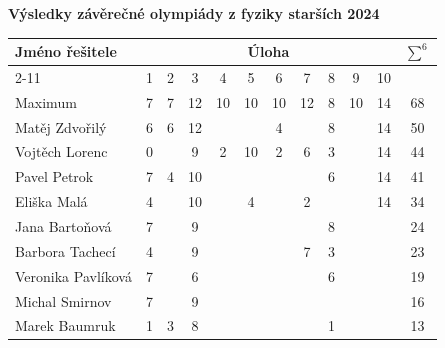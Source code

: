 \documentclass[12pt,a4paper,landscape]{article}
\begin{document}
\begin{center}
\textbf{\Large Výsledky závěrečné olympiády z fyziky starších 2024}
\vspace{1em}

{\large
\noindent\begin{tabular}{|l||c|c|c|c|c|c|c|c|c|c||c|}
\hline
\multirow{2}{*}{Jméno řešitele} & \multicolumn{10}{|c||}{Úloha} & \multirow{2}{*}{$\sum^6$} \\
\cline{2-11}
 & 1 & 2 & 3 & 4 & 5 & 6 & 7 & 8 & 9 & 10 & \\
\hline
Maximum	&	7	&	7	&	12	&	10	&	10	&	10	&	12	&	8	&	10	&	14	&	68	\\
\hline\hline
Matěj Zdvořilý	&	6	&	6	&	12	&		&		&	4	&		&	8	&		&	14	&	50	\\
Vojtěch Lorenc	&	0	&		&	9	&	2	&	10	&	2	&	6	&	3	&		&	14	&	44	\\
Pavel Petrok	&	7	&	4	&	10	&		&		&		&		&	6	&		&	14	&	41	\\
Eliška Malá	&	4	&		&	10	&		&	4	&		&	2	&		&		&	14	&	34	\\
Jana Bartoňová	&	7	&		&	9	&		&		&		&		&	8	&		&		&	24	\\
Barbora Tachecí	&	4	&		&	9	&		&		&		&	7	&	3	&		&		&	23	\\
Veronika Pavlíková	&	7	&		&	6	&		&		&		&		&	6	&		&		&	19	\\
Michal Smirnov	&	7	&		&	9	&		&		&		&		&		&		&		&	16	\\
Marek Baumruk	&	1	&	3	&	8	&		&		&		&		&	1	&		&		&	13	\\
\hline
\end{tabular}
}
\end{center}
\end{document}
